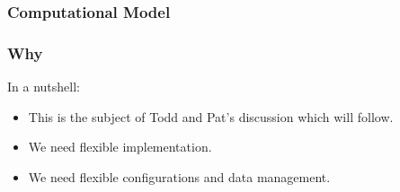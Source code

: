 \documentclass{beamer}
\begin{document}
\begin{frame}
  \frametitle{Computational Model}
\end{frame}


\begin{frame}
  \frametitle{Why}

  {In a nutshell:}

  \begin{itemize}
  \item<1-> This is the subject of Todd and Pat's discussion which
    will follow.
  \item<2-> We need flexible implementation.
  \item<2-> We need flexible configurations and data management.
  \end{itemize}
  

\end{frame}
\end{document}
